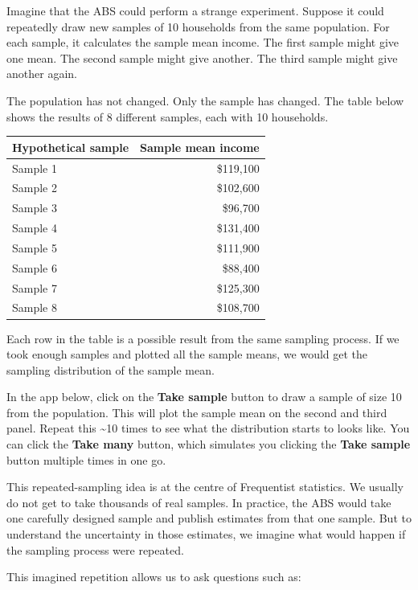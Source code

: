 \documentclass[
  letterpaper,
  DIV=11,
  numbers=noendperiod]{scrreprt}
\begin{document}
Imagine that the ABS could perform a strange experiment. Suppose it
could repeatedly draw new samples of 10 households from the same
population. For each sample, it calculates the sample mean income. The
first sample might give one mean. The second sample might give another.
The third sample might give another again.

The population has not changed. Only the sample has changed. The table
below shows the results of 8 different samples, each with 10 households.

\begin{table}
\fontsize{12.0pt}{14.0pt}\selectfont
\begin{tabular*}{\linewidth}{@{\extracolsep{\fill}}lr}
\toprule
Hypothetical sample & Sample mean income \\ 
\midrule\addlinespace[2.5pt]
Sample 1 & \$119,100 \\ 
Sample 2 & \$102,600 \\ 
Sample 3 & \$96,700 \\ 
Sample 4 & \$131,400 \\ 
Sample 5 & \$111,900 \\ 
Sample 6 & \$88,400 \\ 
Sample 7 & \$125,300 \\ 
Sample 8 & \$108,700 \\ 
\bottomrule
\end{tabular*}
\end{table}

Each row in the table is a possible result from the same sampling
process. If we took enough samples and plotted all the sample means, we
would get the sampling distribution of the sample mean.

In the app below, click on the \textbf{Take sample} button to draw a
sample of size 10 from the population. This will plot the sample mean on
the second and third panel. Repeat this \textasciitilde10 times to see
what the distribution starts to looks like. You can click the
\textbf{Take many} button, which simulates you clicking the \textbf{Take
sample} button multiple times in one go.

This repeated-sampling idea is at the centre of Frequentist statistics.
We usually do not get to take thousands of real samples. In practice,
the ABS would take one carefully designed sample and publish estimates
from that one sample. But to understand the uncertainty in those
estimates, we imagine what would happen if the sampling process were
repeated.

This imagined repetition allows us to ask questions such as:
\end{document}
